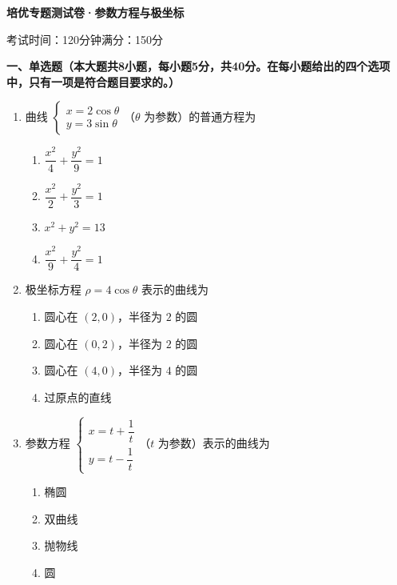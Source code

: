 \documentclass[12pt, a4paper]{ctexart}
\newcommand{\score}[1]{\hfill\makebox[2cm][l]{(#1分)}}
\begin{document}
\begin{center}
\Large\textbf{培优专题测试卷·参数方程与极坐标}

\normalsize
考试时间：120分钟\quad 满分：150分
\end{center}

\vspace{0.5cm}

\noindent\textbf{一、单选题（本大题共8小题，每小题5分，共40分。在每小题给出的四个选项中，只有一项是符合题目要求的。）}

\vspace{0.3cm}

\begin{enumerate}
\item 曲线 $\begin{cases} x = 2\cos\theta \\ y = 3\sin\theta \end{cases}$（$\theta$ 为参数）的普通方程为\score{5}
\begin{enumerate}[label=\Alph*.]
\item $\dfrac{x^2}{4} + \dfrac{y^2}{9} = 1$
\item $\dfrac{x^2}{2} + \dfrac{y^2}{3} = 1$
\item $x^2 + y^2 = 13$
\item $\dfrac{x^2}{9} + \dfrac{y^2}{4} = 1$
\end{enumerate}

\item 极坐标方程 $\rho = 4\cos\theta$ 表示的曲线为\score{5}
\begin{enumerate}[label=\Alph*.]
\item 圆心在 $(2, 0)$，半径为 $2$ 的圆
\item 圆心在 $(0, 2)$，半径为 $2$ 的圆
\item 圆心在 $(4, 0)$，半径为 $4$ 的圆
\item 过原点的直线
\end{enumerate}

\item 参数方程 $\begin{cases} x = t + \dfrac{1}{t} \\ y = t - \dfrac{1}{t} \end{cases}$（$t$ 为参数）表示的曲线为\score{5}
\begin{enumerate}[label=\Alph*.]
\item 椭圆
\item 双曲线
\item 抛物线
\item 圆
\end{enumerate}


\end{enumerate}
\end{document}
